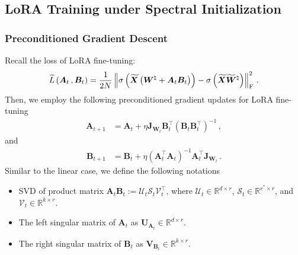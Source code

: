 \subsection{LoRA Training under Spectral Initialization}
\label{app:loraspec}
\subsubsection{Preconditioned Gradient Descent}
\label{PGD-Nonlinear}
Recall the loss of LoRA fine-tuning:
\begin{align*}
    \widetilde{L}\left(\bm A_t\,,\bm B_t\right) = \frac{1}{2N}\left\|\sigma\left(\widetilde{\bm X}\left(\bm W^\natural+\bm A_t \bm B_t\right)\right) - \sigma\left(\widetilde{\bm X}\widetilde{\bm W}^\natural\right)\right\|_{\rm F}^2\,.
\end{align*}
Then, we employ the following preconditioned gradient updates for LoRA fine-tuning
\begin{align}
    \bm A_{t+1} & = \bm A_t + \eta \bm J_{\bm W_t}\bm B_t^{\!\top}\left(\bm B_t\bm B_t^{\!\top}\right)^{-1}\label{eq:orig-prec-A}\,,
\end{align}
and
\begin{align}
    \bm B_{t+1} & = \bm B_t + \eta \left(\bm A_t^{\!\top}\bm A_t\right)^{-1}\bm A_t^{\!\top}\bm J_{\bm W_t}\label{eq:orig-prec-B}\,.
\end{align}
Similar to the linear case, we define the following notations
\begin{itemize}
    \item SVD of product matrix $\bm A_t \bm B_t := \mathcal{U}_t \mathcal{S}_t \mathcal{V}_t^{\!\top}$, where $\mathcal{U}_t \in \mathbb{R}^{d\times r}$, $\mathcal{S}_t \in \mathbb{R}^{r^*\times r}$, and $\mathcal{V}_t\in \mathbb{R}^{k\times r}$.
    \item The left singular matrix of $\bm A_t$ as $\bm U_{\bm A_t} \in \mathbb{R}^{d\times r}$.
    \item The right singular matrix of $\bm B_t$ as $\bm V_{\bm B_t} \in \mathbb{R}^{k\times r}$.
\end{itemize}
